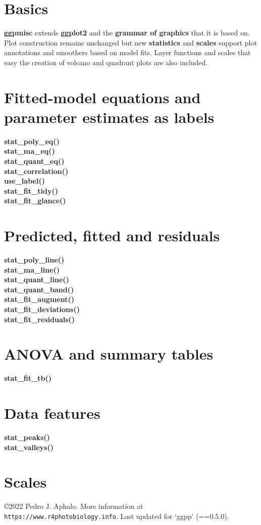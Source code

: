 \documentclass[DIV=25,a3,landscape,9pt]{scrartcl}\usepackage[]{graphicx}\usepackage[]{xcolor}
\begin{document}
\begin{multicols}{3}

\section*{Basics}

\textbf{ggpmisc} extends \textbf{ggplot2} and the \textbf{grammar of graphics} that it is based on. Plot construction remains unchanged but new \textbf{statistics} and \textbf{scales} support plot annotations and smoothers based on model fits. Layer functions and scales that easy the creation of volcano and quadrant plots are also included.



\section*{Fitted-model equations and parameter estimates as labels}

\noindent
\textbf{stat\_poly\_eq()}\\
\textbf{stat\_ma\_eq()}\\
\textbf{stat\_quant\_eq()}\\
\textbf{stat\_correlation()}\\
\textbf{use\_label()}\\
\textbf{stat\_fit\_tidy()}\\
\textbf{stat\_fit\_glance()}

\section*{Predicted, fitted and residuals}

\noindent
\textbf{stat\_poly\_line()}\\
\textbf{stat\_ma\_line()}\\
\textbf{stat\_quant\_line()}\\
\textbf{stat\_quant\_band()}\\
\textbf{stat\_fit\_augment()}\\
\textbf{stat\_fit\_deviations()}\\
\textbf{stat\_fit\_residuals()}

\section*{ANOVA and summary tables}

\noindent
\textbf{stat\_fit\_tb()}

\section*{Data features}

\noindent
\textbf{stat\_peaks()}\\
\textbf{stat\_valleys()}\\

\section*{Scales}


\end{multicols}
\vfill
\centering
\noindent
\copyright 2022 Pedro J. Aphalo. More information at \texttt{https://www.r4photobiology.info}. Last updated for `ggpp' (==0.5.0).
\end{document}
